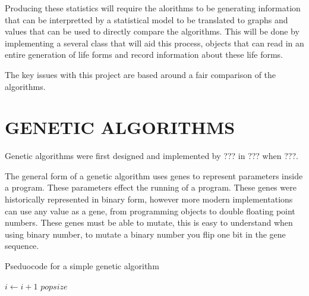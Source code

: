 \documentclass[10pt,twocolumn]{article}
\begin{document}
Producing these statistics will require the alorithms to be generating information that can be interpretted by a statistical model to be translated to graphs and values that can be
used to directly compare the algorithms. This will be done by implementing a several class that will aid this process, objects that can read in an entire generation of life forms
and record information about these life forms. 


The key issues with this project are based around a fair comparison of the algorithms. 

\section{GENETIC ALGORITHMS}

Genetic algorithms were first designed and implemented by ??? in ??? when ???.

The general form of a genetic algorithm uses genes to represent parameters inside a program.
These parameters effect the running of a program.
These genes were historically represented in binary form, however more modern implementations can use any value as a gene, from programming objects to double floating point numbers.
These genes must be able to mutate, this is easy to understand when using binary number, to mutate a binary number you flip one bit in the gene sequence. 

\begin{algorithm}
\caption{Pseduocode for a simple genetic algorithm}
\label{Genetic algorithm pseduocode}
\begin{algorithmic}
		\State $i \gets i + 1$ 
		\State \Return $popsize$
	\EndFor
\EndFunction

\end{algorithmic}
\end{algorithm}
\end{document}
